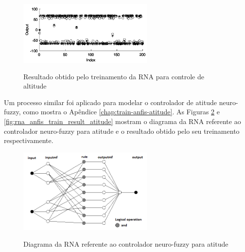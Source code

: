\begin{figure}[!htb]
    \centering
    \caption{Resultado obtido pelo treinamento da RNA para controle de altitude}
    \includegraphics[width=0.6\textwidth]{./04-figuras/anfisedit/rna_anfis_train_result_altitude}
    \label{fig:rna_anfis_train_result_altitude}
\end{figure}


Um processo similar foi aplicado para modelar o controlador de atitude neuro-fuzzy, como mostra o Apêndice \ref{chap:train-anfis-atitude}. As Figuras \ref{fig:rna_anfis_atitude_gray} e \ref{fig:rna_anfis_train_result_atitude} mostram o diagrama da RNA referente ao controlador neuro-fuzzy para atitude e o resultado obtido pelo seu treinamento respectivamente.

\begin{figure}[!htb]
    \centering
    \caption{Diagrama da RNA referente ao controlador neuro-fuzzy para atitude}
    \includegraphics[width=0.6\textwidth]{./04-figuras/anfisedit/rna_anfis_atitude_gray}
    \label{fig:rna_anfis_atitude_gray}
\end{figure}

